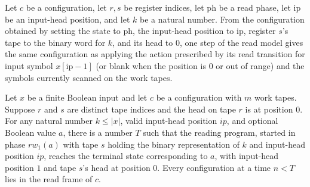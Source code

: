 \begin{theorem}
\label{Complexity.LogProg.read_one}
\leanok
{}
Let $c$ be a configuration, let $r,s$ be register indices, let $\mathrm{ph}$ be a read
phase, let $\mathrm{ip}$ be an input-head position, and let $k$ be a natural number.
From the configuration obtained by setting the state to $\mathrm{ph}$, the input-head
position to $\mathrm{ip}$, register $s$'s tape to the binary word for $k$, and its head
to $0$, one step of the read model gives the same configuration as applying the action
prescribed by its read transition for input symbol $x[\mathrm{ip}-1]$ (or blank when the
position is $0$ or out of range) and the symbols currently scanned on the work tapes.
\end{theorem}

\begin{theorem}
\label{Complexity.LogProg.read_cleanup}
\leanok
{}
Let $x$ be a finite Boolean input and let $c$ be a configuration with $m$ work tapes.
Suppose $r$ and $s$ are distinct tape indices and the head on tape $r$ is at position
$0$. For any natural number $k\le |x|$, valid input-head position $ip$, and optional
Boolean value $a$, there is a number $T$ such that the reading program, started in phase
$rw_1(a)$ with tape $s$ holding the binary representation of $k$ and input-head position
$ip$, reaches the terminal state corresponding to $a$, with input-head position $1$ and
tape $s$'s head at position $0$. Every configuration at a time $n<T$ lies in the read
frame of $c$.
\end{theorem}

